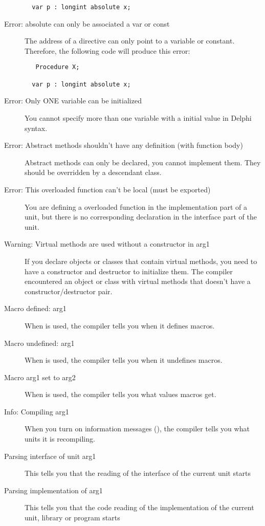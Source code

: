 \begin{description}
\begin{verbatim}
  var p : longint absolute x;
 \end{verbatim}

\item [Error: absolute can only be associated a var or const]
 The address of a  directive can only point to a variable or
 constant. Therefore, the following code will produce this error:
 \begin{verbatim}
   Procedure X;

  var p : longint absolute x;
 \end{verbatim}

\item [Error: Only ONE variable can be initialized]
 You cannot specify more than one variable with a initial value
 in Delphi syntax.
\item [Error: Abstract methods shouldn't have any definition (with function body)]
 Abstract methods can only be declared, you cannot implement them. They
 should be overridden by a descendant class.
\item [Error: This overloaded function can't be local (must be exported)]
 You are defining a overloaded function in the implementation part of a unit,
 but there is no corresponding declaration in the interface part of the unit.
\item [Warning: Virtual methods are used without a constructor in arg1]
 If you declare objects or classes that contain virtual methods, you need
 to have a constructor and destructor to initialize them. The compiler
 encountered an object or class with virtual methods that doesn't have
 a constructor/destructor pair.
\item [Macro defined: arg1]
 When  is used, the compiler tells you when it defines macros.
\item [Macro undefined: arg1]
 When  is used, the compiler tells you when it undefines macros.
\item [Macro arg1 set to arg2]
 When  is used, the compiler tells you what values macros get.
\item [Info: Compiling arg1]
 When you turn on information messages (), the compiler tells you
 what units it is recompiling.
\item [Parsing interface of unit arg1]
 This tells you that the reading of the interface
 of the current unit starts
\item [Parsing implementation of arg1]
 This tells you that the code reading of the implementation
 of the current unit, library or program starts

\end{description}

